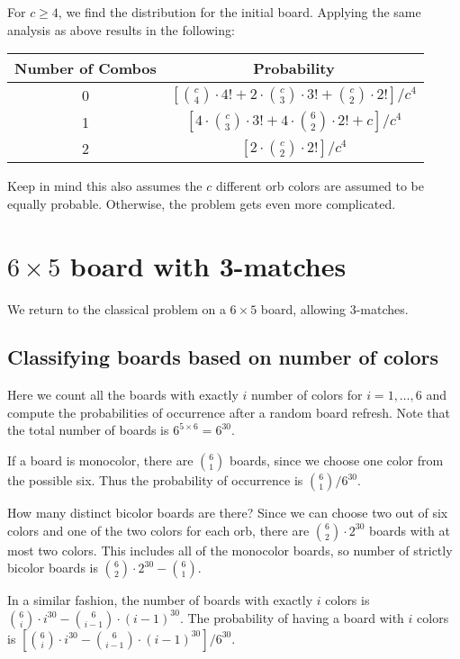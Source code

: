 \documentclass[12pt]{article}
\theoremstyle{definition}
\begin{document}
For $c\geq 4$, we find the distribution for the initial board. Applying the same analysis as above results in the following:
\begin{center}
    \renewcommand{\arraystretch}{2}
    \begin{tabular}{|c|c|}
        \hline
        Number of Combos & Probability \\
        \hline\hline
        0 & $\left[\binom{c}{4}\cdot 4! + 2 \cdot \binom{c}{3}\cdot 3! + \binom{c}{2} \cdot 2!\right]/c^4$\\
        \hline
        1 & $\left[4\cdot \binom{c}{3}\cdot 3!+4\cdot\binom{6}{2}\cdot 2! + c\right]/c^4$ \\
        \hline
        2 & $\left[2\cdot\binom{c}{2}\cdot 2!\right]/c^4$\\
        \hline
    \end{tabular}
    \renewcommand{\arraystretch}{2}
\end{center}
Keep in mind this also assumes the $c$ different orb colors are assumed to be equally probable. Otherwise, the problem gets even more complicated.


\section{$6\times 5$ board with 3-matches}
We return to the classical problem on a $6\times 5$ board, allowing 3-matches.

\subsection{Classifying boards based on number of colors}

Here we count all the boards with exactly $i$ number of colors for $i=1,\dots,6$ and compute the probabilities of occurrence after a random board refresh. Note that the total number of boards is $6^{5\times 6}=6^{30}$.

If a board is monocolor, there are $\binom{6}{1}$ boards, since we choose one color from the possible six. Thus the probability of occurrence is $\binom{6}{1}/6^{30}$.

How many distinct bicolor boards are there? Since we can choose two out of six colors and one of the two colors for each orb, there are $\binom{6}{2}\cdot 2^{30}$ boards with at most two colors. This includes all of the monocolor boards, so number of strictly bicolor boards is $\binom{6}{2}\cdot 2^{30}-\binom{6}{1}$.

In a similar fashion, the number of boards with exactly $i$ colors is $\binom{6}{i}\cdot i^{30}-\binom{6}{i-1}\cdot (i-1)^{30}$. The probability of having a board with $i$ colors is $\left[\binom{6}{i}\cdot i^{30}-\binom{6}{i-1}\cdot (i-1)^{30}\right]/6^{30}$.
\end{document}
